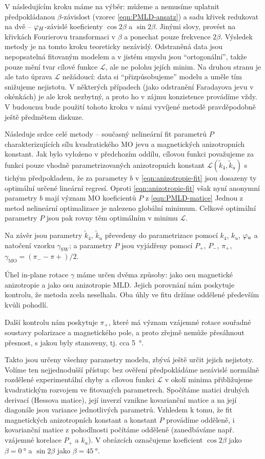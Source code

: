 V následujícím kroku máme na výběr: můžeme a nemusíme uplatnit předpokládanou $\beta$-závislost (vzorec \eqref{eqn:PMLD-ansatz}) a sadu křivek redukovat na dvě -- $\varphi_H$-závislé koeficienty $\cos2\beta$ a $\sin2\beta$.
Jinými slovy, provést na křivkách Fourierovu transformaci v $\beta$ a ponechat pouze frekvence $2\beta$.
Výsledek metody je na tomto kroku teoreticky nezávislý.
Odstraněná data jsou nepopsatelná fitovaným modelem a v jistém smyslu jsou ``ortogonální'', takže pouze mění tvar cílové funkce $\mathcal{L}$, ale ne polohu jejích minim.
Na druhou stranu je ale tato úprava $\mathcal{L}$ nežádoucí: data si ``přizpůsobujeme'' modelu a uměle tím snižujeme nejistotu.
V některých případech (jako odstranění Faradayova jevu v okénkách) je ale krok nezbytný, a proto ho v zájmu konzistence provádíme vždy.
V budoucnu bude použití tohoto kroku v námi vyvíjené metodě pravděpodobně ještě předmětem diskuze.

Následuje srdce celé metody -- současný nelineární fit parametrů $P$ charakterizujících sílu kvadratického MO jevu a magnetických anizotropních konstant.
Jak bylo vyloženo v předchozím oddílu, cílovou funkci považujeme za funkci pouze vhodně parametrizovaných anizotropních konstant $\mathcal{L}(\tilde{k}_4, \tilde{k}_u)$ s tichým předpokladem, že za parametry $b$ v \eqref{eqn:anizotropie-fit} jsou dosazeny ty optimální určené lineární regresí.
Oproti \eqref{eqn:anizotropie-fit} však nyní anonymní parametry $b$ mají význam MO koeficientů $P$ z \eqref{eqn:PMLD-matice}
Jednou z metod nelineární optimalizace je nalezeno globální minimum.
Celkové optimální parametry $P$ jsou pak rovny těm optimálním v minimu $\mathcal{L}$.

Na závěr jsou parametry $\tilde{k}_4$, $\tilde{k}_u$ převedeny do parametrizace pomocí $k_4$, $k_u$, $\varphi_u$ a natočení vzorku $\gamma_\textrm{SW}$; a parametry $P$ jsou vyjádřeny pomocí $P_+$, $P_-$, $\pi_+$, $\gamma_\textrm{MO}=(\pi_--\pi+)/2$.

Úhel in-plane rotace $\gamma$ máme určen dvěma způsoby: jako osu magnetické anizotropie a jako osu anizotropie MLD.
Jejich porovnání nám poskytuje kontrolu, že metoda zcela neselhala.
Oba úhly ve fitu držíme oddělené především kvůli pohodlí.

Další kontrolu nám poskytuje $\pi_+$, které má význam vzájemné rotace souřadné soustavy polarizace a magnetického pole, a proto zřejmě nemůže přesáhnout přesnost, s jakou byly stanoveny, tj. cca \SI{5}{\degree}.

Takto jsou určeny všechny parametry modelu, zbývá ještě určit jejich nejistoty.
Volíme ten nejjednodušší přístup: bez ověření předpokládáme nezávislé normálně rozdělené experimentální chyby a cílovou funkci $\mathcal{L}$ v okolí minima přibližujeme kvadratickým rozvojem ve fitovaných parametrech.
Spočítáme matici druhých derivací (Hessova matice), její inverzí vznikne kovarianční matice a na její diagonále jsou variance jednotlivých parametrů.
Vzhledem k tomu, že fit magnetických anizotropních konstant a konstant $P$ provádíme odděleně, i kovarianční matice z pohodlnosti počítáme odděleně (zanedbáváme např. vzájemné korelace $P_+$ a $k_u$).
V obrázcích označujeme koeficient $\cos2\beta$ jako $\beta=\SI{0}{\degree}$ a $\sin2\beta$ jako $\beta=\SI{45}{\degree}$.

